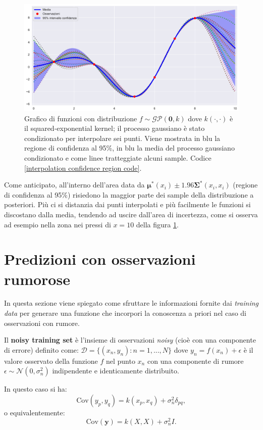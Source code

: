 \newpage
\begin{figure}[h]
    \centering
    \includegraphics[width=1\textwidth]{images/Gaussian process/Noise-free - mean&samples.pdf}
    \caption{Grafico di funzioni con distribuzione $f\sim \mathcal{GP}(\bm{0},k)$ dove $k(\cdot,\cdot)$ è il squared-exponential kernel; il processo gaussiano è stato condizionato per interpolare sei punti. Viene mostrata in blu la regione di confidenza al 95\%, in blu la media del processo gaussiano condizionato e come linee tratteggiate alcuni sample. Codice \ref{interpolation confidence region code}.}
    \label{Interpolation confidence region}
\end{figure}

Come anticipato, all'interno dell'area data da $\bm{\mu^*}(x_i)\pm 1.96\bm{\Sigma^*}(x_i,x_i)$ (regione di confidenza al 95\%) risiedono la maggior parte dei sample della distribuzione a posteriori. Più ci si distanzia dai punti interpolati e più facilmente le funzioni si discostano dalla media, tendendo ad uscire dall'area di incertezza, come si osserva ad esempio nella zona nei pressi di $x=10$ della figura \ref{Interpolation confidence region}.



\section{Predizioni con osservazioni rumorose}\label{noisyPrediction}
In questa sezione viene spiegato come sfruttare le informazioni fornite dai \textit{training data} per generare una funzione che incorpori la conoscenza a priori nel caso di osservazioni con rumore. \\

\begin{defi}
Il \textbf{noisy training set} è l'insieme di osservazioni \textit{noisy} (cioè con una componente di errore) definito come: $\mathcal{D}=\{(x_n,y_n): n=1,...,N\}$ dove $y_n=f(x_n)+\epsilon$ è il valore osservato della funzione $f$ nel punto $x_n$ con una componente di rumore $\epsilon\sim \mathcal{N}(0,\sigma_n^2)$ indipendente e identicamente distribuito. 
\end{defi}
In questo caso si ha:
\[
\text{Cov}(y_p,y_q)=k(x_p,x_q)+\sigma_n^2 \delta_{pq},
\]
o equivalentemente:
\[
\text{Cov}(\mathbf{y})=k(X,X)+\sigma_n^2I.
\]

